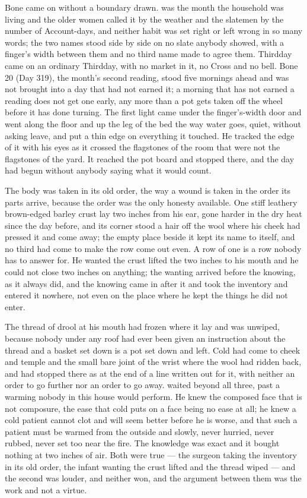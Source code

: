 Bone came on without a boundary drawn.  was the month the household was living and the older women called it by the weather and the slatemen by the number of Account-days, and neither habit was set right or left wrong in so many words; the two names stood side by side on no slate anybody showed, with a finger's width between them and no third name made to agree them. Thirdday came on an ordinary Thirdday, with no market in it, no Cross and no bell. Bone 20 (Day 319), the month's second reading, stood five mornings ahead and was not brought into a day that had not earned it; a morning that has not earned a reading does not get one early, any more than a pot gets taken off the wheel before it has done turning. The first light came under the finger's-width door and went along the floor and up the leg of the bed the way water goes, quiet, without asking leave, and put a thin edge on everything it touched. He tracked the edge of it with his eyes as it crossed the flagstones of the room that were not the flagstones of the yard. It reached the pot board and stopped there, and the day had begun without anybody saying what it would count.

The body was taken in its old order, the way a wound is taken in the order its parts arrive, because the order was the only honesty available. One stiff leathery brown-edged barley crust lay two inches from his ear, gone harder in the dry heat since the day before, and its corner stood a hair off the wool where his cheek had pressed it and come away; the empty place beside it kept its name to itself, and no third had come to make the row come out even. A row of one is a row nobody has to answer for. He wanted the crust lifted the two inches to his mouth and he could not close two inches on anything; the wanting arrived before the knowing, as it always did, and the knowing came in after it and took the inventory and entered it nowhere, not even on the place where he kept the things he did not enter.

The thread of drool at his mouth had frozen where it lay and was unwiped, because nobody under any roof had ever been given an instruction about the thread and a basket set down is a pot set down and left. Cold had come to cheek and temple and the small bare joint of the wrist where the wool had ridden back, and had stopped there as at the end of a line written out for it, with neither an order to go further nor an order to go away.  waited beyond all three, past a warming nobody in this house would perform. He knew the composed face that is not composure, the ease that cold puts on a face being no ease at all; he knew a cold patient cannot clot and will seem better before he is worse, and that such a patient must be warmed from the outside and slowly, never hurried, never rubbed, never set too near the fire. The knowledge was exact and it bought nothing at two inches of air. Both were true --- the surgeon taking the inventory in its old order, the infant wanting the crust lifted and the thread wiped --- and the second was louder, and neither won, and the argument between them was the work and not a virtue.

